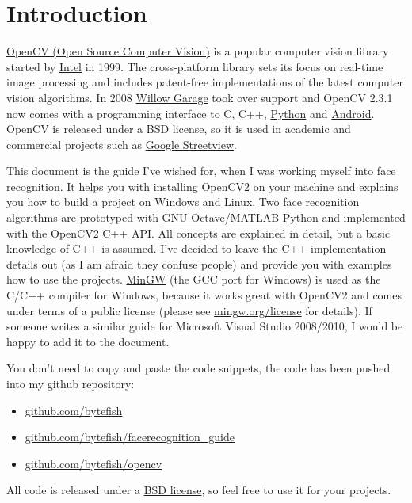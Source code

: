 \section{Introduction}

\href{http://opencv.willowgarage.com}{OpenCV (Open Source Computer Vision)} is a popular computer vision library started by \href{http://www.intel.com}{Intel} in 1999. The cross-platform library sets its focus on real-time image processing and includes patent-free implementations of the latest computer vision algorithms. In 2008 \href{http://www.willowgarage.com}{Willow Garage} took over support and OpenCV 2.3.1 now comes with a programming interface to C, C++, \href{http://www.python.org}{Python} and \href{http://www.android.com}{Android}. OpenCV is released under a BSD license, so it is used in academic and commercial projects such as \href{http://www.google.com/streetview}{Google Streetview}.

This document is the guide I've wished for, when I was working myself into face recognition. It helps you with installing OpenCV2 on your machine and explains you how to build a project on Windows and Linux. Two face recognition algorithms are prototyped with \ifx\python\undefined \href{http://www.gnu.org/software/octave/}{GNU Octave}/\href{http://www.mathworks.com}{MATLAB} \else \href{http://www.python.org}{Python}\fi{} and implemented with the OpenCV2 C++ API. All concepts are explained in detail, but a basic knowledge of C++ is assumed. I've decided to leave the C++ implementation details out (as I am afraid they confuse people) and provide you with examples how to use the projects. \href{http://www.mingw.org}{MinGW} (the GCC port for Windows) is used as the C/C++ compiler for Windows, because it works great with OpenCV2 and comes under terms of a public license (please see \href{http://www.mingw.org/license}{mingw.org/license} for details). If someone writes a similar guide for Microsoft Visual Studio 2008/2010, I would be happy to add it to the document.

You don't need to copy and paste the code snippets, the code has been pushed into my github repository:

\begin{itemize}
  \item \href{http://www.github.com/bytefish}{github.com/bytefish}
  \item \href{http://www.github.com/bytefish/facerecognition_guide}{github.com/bytefish/facerecognition\_guide}
  \item \href{http://www.github.com/bytefish/opencv}{github.com/bytefish/opencv}
\end{itemize}

All code is released under a \href{http://www.opensource.org/licenses/bsd-license}{BSD license}, so feel free to use it for your projects.
